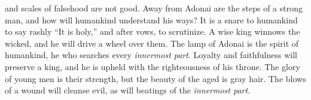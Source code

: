 \begin{biblechapter}
and scales of falsehood are not good.
\verse Away from Adonai are the steps of a strong man, 
and how will humankind understand his ways?
\verse It is a snare to humankind to say rashly “It is holy,” 
and after vows, to scrutinize.
\verse A wise king winnows the wicked, 
and he will drive a wheel over them.
\verse The lamp of Adonai is the spirit of humankind, 
he who searches every \textit{innermost part}.
\verse Loyalty and faithfulness will preserve a king, 
and he is upheld with the righteousness of his throne.
\verse The glory of young men is their strength, 
but the beauty of the aged is gray hair.
\verse The blows of a wound will cleanse evil, 
as will beatings of the \textit{innermost part}.
\end{biblechapter}

